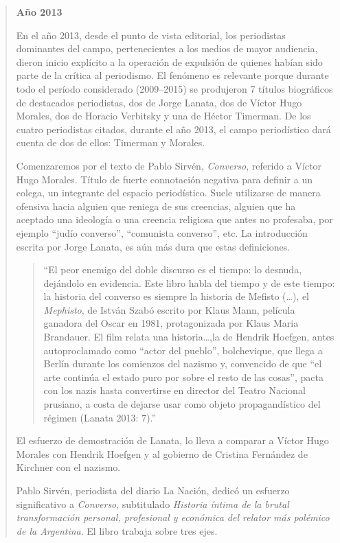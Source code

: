 \begin{quote}
\textbf{Año 2013}

En el año 2013, desde el punto de vista editorial, los periodistas dominantes del campo, pertenecientes a los medios de mayor audiencia, dieron inicio explícito a la operación de expulsión de quienes habían sido parte de la crítica al periodismo. El fenómeno es relevante porque durante todo el período considerado (2009--2015) se produjeron 7 títulos biográficos de destacados periodistas, dos de Jorge Lanata, dos de Víctor Hugo Morales, dos de Horacio Verbitsky y una de Héctor Timerman. De los cuatro periodistas citados, durante el año 2013, el campo periodístico dará cuenta de dos de ellos: Timerman y Morales.

Comenzaremos por el texto de Pablo Sirvén, \emph{Converso}, referido a Víctor Hugo Morales. Título de fuerte connotación negativa para definir a un colega, un integrante del espacio periodístico. Suele utilizarse de manera ofensiva hacia alguien que reniega de sus creencias, alguien que ha aceptado una ideología o una creencia religiosa que antes no profesaba, por ejemplo ``judío converso'', ``comunista converso'', etc. La introducción escrita por Jorge Lanata, es aún más dura que estas definiciones.

\begin{quote}
	\enquote{El peor enemigo del doble discurso es el tiempo: lo desnuda, dejándolo en evidencia. Este libro habla del tiempo y de este tiempo: la historia del converso es siempre la historia de Mefisto (\dots), el \emph{Mephisto}, de István Szabó escrito por Klaus Mann, película ganadora del Oscar en 1981, protagonizada por Klaus Maria Brandauer. El film relata una historia\dots,la de Hendrik Hoefgen, antes autoproclamado como ``actor del pueblo'', bolchevique, que llega a Berlín durante los comienzos del nazismo y, convencido de que ``el arte continúa el estado puro por sobre el resto de las cosas'', pacta con los nazis hasta convertirse en director del Teatro Nacional prusiano, a costa de dejarse usar como objeto propagandístico del régimen (Lanata 2013: 7).}
\end{quote}


El esfuerzo de demostración de Lanata, lo lleva a comparar a Víctor Hugo Morales con Hendrik Hoefgen y al gobierno de Cristina Fernández de Kirchner con el nazismo.

Pablo Sirvén, periodista del diario La Nación, dedicó un esfuerzo significativo a \emph{Converso}, subtitulado \emph{Historia íntima de la brutal transformación personal, profesional y económica del relator más polémico de la Argentina}. El libro trabaja sobre tres ejes.


\end{quote}
